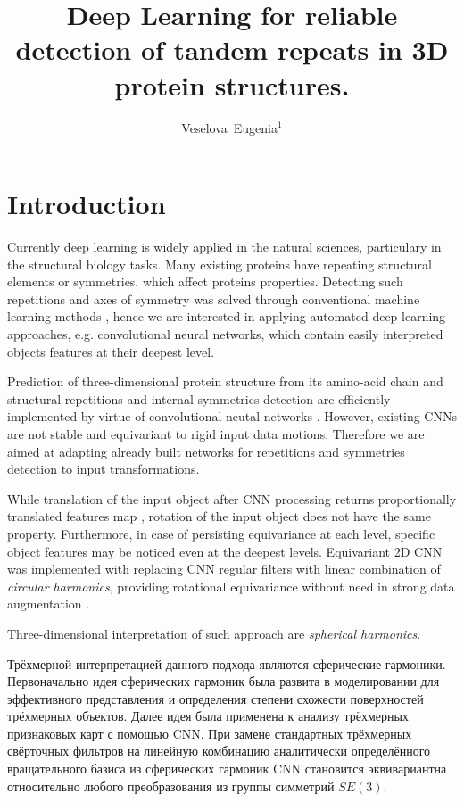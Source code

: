 \documentclass[12pt,twosides]{article}
\title
[Detection of tandem repeats in proteins]
{Deep Learning for reliable detection of tandem repeats in 3D protein structures.}
\author
[Veselova~Eugenia] 
{Veselova~Eugenia$^1$}
\begin{document}
	\maketitle
	
	\section{Introduction}
	Currently deep learning is widely applied in the natural sciences, particulary in the structural biology tasks. Many existing proteins have repeating structural elements or symmetries, which affect proteins properties. Detecting such repetitions and axes of symmetry was solved through conventional machine learning methods \cite{MitGuiPau06}, hence we are interested in applying automated deep learning approaches, e.g. convolutional neural networks, which contain easily interpreted objects features at their deepest level.

	Prediction of three-dimensional protein structure from its amino-acid chain \cite{BioCNN18} and structural repetitions and internal symmetries detection are efficiently implemented by virtue of convolutional neutal networks \cite{DeepSymmetry18}. However, existing CNNs are not stable and equivariant to rigid input data motions. Therefore we are aimed at adapting already built networks for repetitions and symmetries detection to input transformations.
	
	While translation of the input object after CNN processing returns proportionally translated features map \cite{Lenc18}, rotation of the input object does not have the same property. Furthermore, in case of persisting equivariance at each level, specific object features may be noticed even at the deepest levels. Equivariant 2D CNN was implemented with replacing CNN regular filters with linear combination of \textit{circular harmonics}, providing rotational equivariance without need in strong data augmentation \cite{conf/cvpr/WorrallGTB17}. 
	
	Three-dimensional interpretation of such approach are \textit{spherical harmonics}.
	
	 Трёхмерной интерпретацией данного подхода являются сферические гармоники. Первоначально идея сферических гармоник была развита в моделировании для эффективного представления и определения степени схожести поверхностей трёхмерных объектов\cite{conf/siggraph/KazhdanF02, journals/cagd/MousaCAG08}. Далее идея была применена к анализу трёхмерных признаковых карт с помощью CNN. При замене стандартных трёхмерных свёрточных фильтров на линейную комбинацию аналитически определённого вращательного базиса из сферических гармоник CNN становится эквивариантна относительно любого преобразования из группы симметрий $SE(3)$\cite{DBLP:journals/corr/abs-1807-02547}.
	
\end{document}
